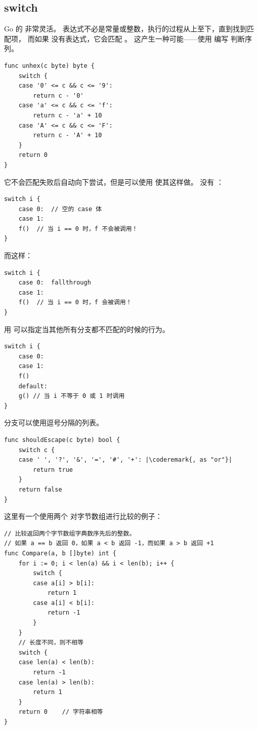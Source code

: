\subsection{switch}
Go 的  非常灵活。
表达式不必是常量或整数，执行的过程从上至下，直到找到匹配项，
而如果  没有表达式，它会匹配  。
这产生一种可能——使用  编写  判断序列。
\begin{lstlisting}
func unhex(c byte) byte {
    switch {
    case '0' <= c && c <= '9':
        return c - '0'
    case 'a' <= c && c <= 'f':
        return c - 'a' + 10
    case 'A' <= c && c <= 'F':
        return c - 'A' + 10
    }
    return 0
}
\end{lstlisting}
它不会匹配失败后自动向下尝试，但是可以使用
使其这样做。
没有 ：
\begin{lstlisting}
switch i {
    case 0:  // 空的 case 体
    case 1:
	f()  // 当 i == 0 时，f 不会被调用！
}
\end{lstlisting}
而这样：
\begin{lstlisting}
switch i {
    case 0:  fallthrough
    case 1:
	f()  // 当 i == 0 时，f 会被调用！
}
\end{lstlisting}
用  可以指定当其他所有分支都不匹配的时候的行为。
\begin{lstlisting}
switch i {
    case 0:  
    case 1:
	f()
    default:	
	g()	// 当 i 不等于 0 或 1 时调用
}
\end{lstlisting}

分支可以使用逗号分隔的列表。
\begin{lstlisting}
func shouldEscape(c byte) bool {
    switch c {
    case ' ', '?', '&', '=', '#', '+': |\coderemark{, as "or"}|
        return true
    }
    return false
}
\end{lstlisting}

这里有一个使用两个  对字节数组进行比较的例子：
\begin{lstlisting}
// 比较返回两个字节数组字典数序先后的整数。
// 如果 a == b 返回 0，如果 a < b 返回 -1，而如果 a > b 返回 +1
func Compare(a, b []byte) int {
    for i := 0; i < len(a) && i < len(b); i++ {
        switch {
        case a[i] > b[i]:
            return 1
        case a[i] < b[i]:
            return -1
        }
    }
    // 长度不同，则不相等
    switch {
    case len(a) < len(b):
        return -1
    case len(a) > len(b):
        return 1
    }
    return 0	// 字符串相等
}
\end{lstlisting}

